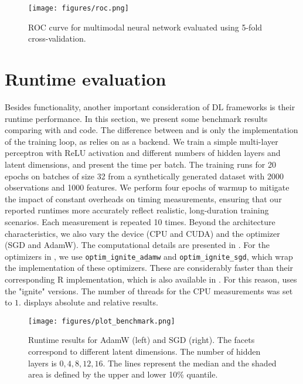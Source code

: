 \documentclass[article]{jss}
\theoremstyle{definition}
\begin{document}
\begin{figure}[H]
    \centering
    \texttt{[image: figures/roc.png]}
    \caption{ROC curve for multimodal neural network evaluated using 5-fold cross-validation.}
    \label{fig:roc-curve}
\end{figure}

\section{Runtime evaluation}\label{sec:benchmarks}

Besides functionality, another important consideration of DL frameworks is their runtime performance.
In this section, we present some benchmark results comparing \mlrttorch{} with \torch{} and \pytorch{} code.
The difference between \mlrttorch{} and \torch{} is only the implementation of the training loop, as \mlrttorch{} relies on \torch{} as a backend.
We train a simple multi-layer perceptron with ReLU activation and different numbers of hidden layers and latent dimensions, and present the time per batch.
The training runs for 20 epochs on batches of size 32 from a synthetically generated dataset with 2000 observations and 1000 features.
We perform four epochs of warmup to mitigate the impact of constant overheads on timing measurements, ensuring that our reported runtimes more accurately reflect realistic, long-duration training scenarios.
Each measurement is repeated 10 times.
Beyond the architecture characteristics, we also vary the device (CPU and CUDA) and the optimizer (SGD and AdamW).
The computational details are presented in .
For the optimizers in \rlang{}, we use \texttt{optim\_ignite\_adamw} and \texttt{optim\_ignite\_sgd}, which wrap the \libtorch{} \cpp{} implementation of these optimizers. These are considerably faster than their corresponding R implementation, which is also available in \torch{}.
For this reason, \mlrttorch{} uses the "ignite" versions.
The number of threads for the CPU measurements was set to $1$.
 displays absolute and  relative results.

\begin{figure}[h]
    \centering
    \texttt{[image: figures/plot\_benchmark.png]}
    \caption{Runtime results for AdamW (left) and SGD (right). The facets correspond to different latent dimensions. The number of hidden layers is $0, 4, 8, 12, 16$.
    The lines represent the median and the shaded area is defined by the upper and lower 10\% quantile.
}
    \label{fig:optimizer-benchmark}
\end{figure}
\end{document}
